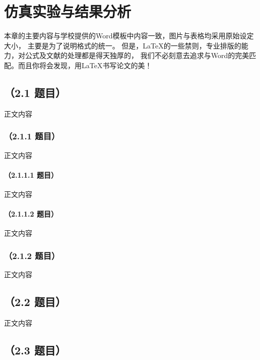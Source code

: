\chapter{仿真实验与结果分析}

本章的主要内容与学校提供的Word模板中内容一致，图片与表格均采用原始设定大小，%
主要是为了说明格式的统一。%
但是，\LaTeX{}的一些禁则，专业排版的能力，对公式及文献的处理都是得天独厚的，%
我们不必刻意去追求与Word的完美匹配。而且你将会发现，用\LaTeX{}书写论文的美！ %

\section{（2.1 题目）}
正文内容

\subsection{（2.1.1 题目）}
正文内容

\subsubsection{（2.1.1.1 题目）}
正文内容

\subsubsection{（2.1.1.2 题目）}
正文内容

\subsection{（2.1.2 题目）}
正文内容


\section{（2.2 题目）}
正文内容

\section{（2.3 题目）}


